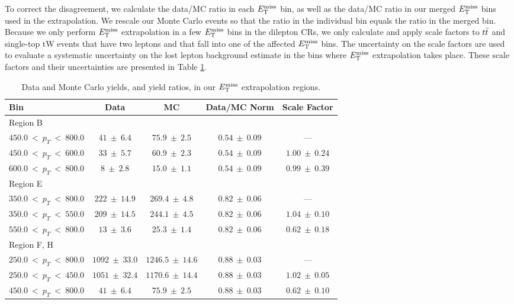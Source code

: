 To correct the disagreement, we calculate the data/MC ratio in each
$E_\text{T}^\text{miss}$ bin, as well as the data/MC ratio in our merged $E_\text{T}^\text{miss}$ bins
used in the extrapolation. We rescale our Monte Carlo
events so that the ratio in the individual bin equals the ratio in the
merged bin. Because we only perform $E_\text{T}^\text{miss}$ extrapolation in a few
$E_\text{T}^\text{miss}$ bins in the dilepton CRs, we only calculate and apply scale
factors to $t\bar{t}$ and single-top tW events that have two leptons and
that fall into one of the affected $E_\text{T}^\text{miss}$ bins. The uncertainty on the
scale factors are used to evaluate a systematic uncertainty on the
lost lepton background estimate in the bins where $E_\text{T}^\text{miss}$ extrapolation
takes place. These scale factors and their uncertainties are presented
in Table \ref{tab:emu:sfmetextrap}.

\begin{table}[htb]
\centering
\caption{Data and Monte Carlo yields, and yield ratios, in our $E_\text{T}^\text{miss}$
  extrapolation regions.}
\label{tab:emu:sfmetextrap}
\begin{tabular}{|l|c|c|c|c|} \hline
Bin & Data & MC & Data/MC Norm & Scale Factor \\ \hline \hline
 \multicolumn{5}{|l|}{Region B} \\ \hline
 $450.0~<~p_{T}~<~800.0$ & $41~\pm~6.4$ & $75.9~\pm~2.5$ & $0.54~\pm~0.09$ & ---\\ \hline \hline
 $450.0~<~p_{T}~<~600.0$ & $33~\pm~5.7$ & $60.9~\pm~2.3$ & $0.54~\pm~0.09$ & $1.00~\pm~0.24$ \\ \hline
 $600.0~<~p_{T}~<~800.0$ & $8~\pm~2.8$ & $15.0~\pm~1.1$ & $0.54~\pm~0.09$ & $0.99~\pm~0.39$ \\ \hline
\hline
\multicolumn{5}{|l|}{Region E} \\ \hline
 $350.0~<~p_{T}~<~800.0$ & $222~\pm~14.9$ & $269.4~\pm~4.8$ & $0.82~\pm~0.06$ & ---\\ \hline \hline
 $350.0~<~p_{T}~<~550.0$ & $209~\pm~14.5$ & $244.1~\pm~4.5$ & $0.82~\pm~0.06$ & $1.04~\pm~0.10$ \\ \hline
 $550.0~<~p_{T}~<~800.0$ & $13~\pm~3.6$ & $25.3~\pm~1.4$ & $0.82~\pm~0.06$ & $0.62~\pm~0.18$ \\ \hline
\hline
\multicolumn{5}{|l|}{Region F, H} \\ \hline
 $250.0~<~p_{T}~<~800.0$ & $1092~\pm~33.0$ & $1246.5~\pm~14.6$ & $0.88~\pm~0.03$ & ---\\ \hline \hline
 $250.0~<~p_{T}~<~450.0$ & $1051~\pm~32.4$ & $1170.6~\pm~14.4$ & $0.88~\pm~0.03$ & $1.02~\pm~0.05$ \\ \hline
 $450.0~<~p_{T}~<~800.0$ & $41~\pm~6.4$ & $75.9~\pm~2.5$ & $0.88~\pm~0.03$ & $0.62~\pm~0.10$ \\ \hline
\end{tabular}
\end{table}

